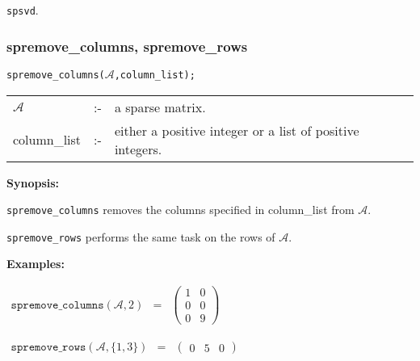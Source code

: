 \hspace*{0.175in} \texttt{spsvd}.

\subsubsection{spremove\_columns, spremove\_rows}

\hspace*{0.175in} \texttt{spremove\_columns($\mathcal{A}$,column\_list);}

\hspace*{0.1in}  
\begin{tabular}{l l l} 
$\mathcal{A}$   &:-& a sparse matrix. \\
column\_list &:-& either a positive integer or a list of 
                  positive integers.
\end{tabular}

\textbf{Synopsis:}

\hspace*{0.175in} \texttt{spremove\_columns} removes the columns specified in
                column\_list from $\mathcal{A}$. 

\hspace*{0.175in} \texttt{spremove\_rows} performs the same task on the rows 
                of $\mathcal{A}$.

\textbf{Examples:} 

\begin{flushleft}  
\hspace*{0.1in}
\begin{math}  
\begin{array}{ccc}
\texttt{spremove\_columns}(\mathcal{A},2) & = & 
        \left( \begin{array}{cc} 1 & 0 \\ 0 & 0 \\ 0 & 9  
 \end{array} \right) 
\end{array}
\end{math}  
\end{flushleft}

\vspace*{0.1in}

\begin{flushleft}  
\hspace*{0.1in}
\begin{math}  
\begin{array}{ccc}
\texttt{spremove\_rows}(\mathcal{A},\{1,3\}) & = & 
        \left( \begin{array}{ccc} 0 & 5 & 0
 \end{array} \right) 
\end{array}
\end{math}  
\end{flushleft}


